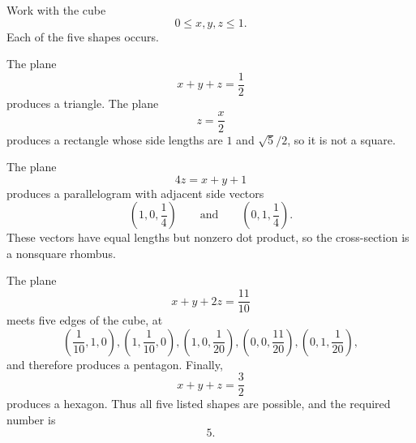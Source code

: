     \begin{solution}
        Work with the cube
        \[
            0\leq x,y,z\leq1.
        \]
        Each of the five shapes occurs.

        The plane
        \[
            x+y+z=\frac12
        \]
        produces a triangle. The plane
        \[
            z=\frac{x}{2}
        \]
        produces a rectangle whose side lengths are $1$ and $\sqrt5/2$, so it
        is not a square.

        The plane
        \[
            4z=x+y+1
        \]
        produces a parallelogram with adjacent side vectors
        \[
            \left(1,0,\frac14\right)
            \qquad\text{and}\qquad
            \left(0,1,\frac14\right).
        \]
        These vectors have equal lengths but nonzero dot product, so the
        cross-section is a nonsquare rhombus.

        The plane
        \[
            x+y+2z=\frac{11}{10}
        \]
        meets five edges of the cube, at
        \[
            \left(\frac1{10},1,0\right),
            \left(1,\frac1{10},0\right),
            \left(1,0,\frac1{20}\right),
            \left(0,0,\frac{11}{20}\right),
            \left(0,1,\frac1{20}\right),
        \]
        and therefore produces a pentagon. Finally,
        \[
            x+y+z=\frac32
        \]
        produces a hexagon. Thus all five listed shapes are possible, and the
        required number is
        \[
            \boxed{5}.
        \]
    \end{solution}
